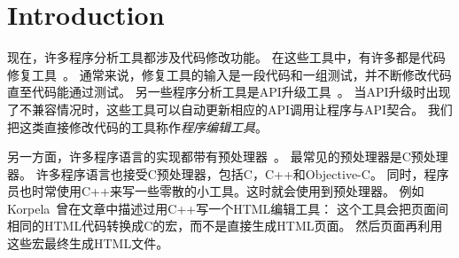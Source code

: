 

\section{Introduction}
\label{sec:intro}


现在，许多程序分析工具都涉及代码修改功能。
在这些工具中，有许多都是代码修复工具~\parencite{le2012genprog,le2012systematic,QiMLDW14,nguyen2013semfix}。
通常来说，修复工具的输入是一段代码和一组测试，并不断修改代码直至代码能通过测试。
另一些程序分析工具是API升级工具~\parencite{li2015swin,Padioleau06,Meng:2011}。
当API升级时出现了不兼容情况时，这些工具可以自动更新相应的API调用让程序与API契合。
我们把这类直接修改代码的工具称作\emph{程序编辑工具}。

另一方面，许多程序语言的实现都带有预处理器~\parencite{ernst2002empirical,kohlbecker1986hygienic,lee2012marco}。
最常见的预处理器是C预处理器。
许多程序语言也接受C预处理器，包括C，C++和Objective-C。
同时，程序员也时常使用C++来写一些零散的小工具。这时就会使用到预处理器。
例如Korpela~\parencite{Korpela2000}曾在文章中描述过用C++写一个HTML编辑工具：
这个工具会把页面间相同的HTML代码转换成C的宏，而不是直接生成HTML页面。
然后页面再利用这些宏最终生成HTML文件。

